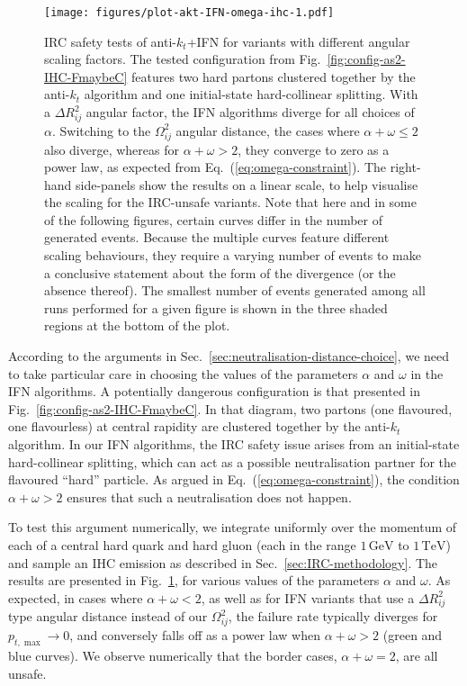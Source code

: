 \documentclass[nofootinbib,twocolumn,preprintnumbers,superscriptaddress,aps]{revtex4-2}
\newcommand{\GeV}{\,\text{GeV}}
\newcommand{\TeV}{\,\text{TeV}}
\newcommand{\ptmax}{p_{t,\max}}
\begin{document}
\begin{figure}
  \centering
  \texttt{[image: figures/plot-akt-IFN-omega-ihc-1.pdf]}
  \caption{
  IRC safety tests of anti-$k_t$+IFN for variants with different angular scaling factors. 
  The tested configuration from Fig.~\ref{fig:config-as2-IHC-FmaybeC} features two hard partons clustered
  together by the anti-$k_t$ algorithm and one initial-state hard-collinear
  splitting.
  With a $\Delta R_{ij}^2$ angular factor, the IFN algorithms diverge for all choices of $\alpha$.
  Switching to the $\Omega_{ij}^2$ angular distance, the cases where $\alpha+\omega \leq 2$ also diverge,
  whereas for $\alpha+\omega > 2$, they converge to zero as
  a power law, as expected from Eq.~(\ref{eq:omega-constraint}).
  The right-hand side-panels show the results on a linear scale,
  to help visualise the scaling for the IRC-unsafe variants.
  Note that here and in some of the following figures, certain curves differ
  in the number of generated events.
  Because the multiple curves feature
  different scaling behaviours, they require a varying number of events
  to make a conclusive statement about the form of the divergence (or
  the absence thereof).
  The smallest number of events generated among all runs performed for a
  given figure is shown in the three shaded regions at the bottom of the plot.
  }
  \label{fig:IFN-omegas}
\end{figure}


According to the arguments in Sec.~\ref{sec:neutralisation-distance-choice}, we need to take particular
care in choosing the values of the parameters $\alpha$ and $\omega$ in the
IFN algorithms.
%
A potentially dangerous configuration is that presented in
Fig.~\ref{fig:config-as2-IHC-FmaybeC}.
%
In that diagram, two partons (one flavoured, one flavourless) at central
rapidity are clustered together by the anti-$k_t$ algorithm. In our IFN
algorithms, the IRC safety issue arises from an initial-state hard-collinear
splitting, which can act as a possible neutralisation partner for the
flavoured ``hard'' particle.
%
As argued in Eq.~(\ref{eq:omega-constraint}), the condition
$\alpha+\omega > 2$ ensures that such a neutralisation does not happen.


To test this argument numerically, we integrate uniformly
over the momentum of each of a central hard quark and hard gluon (each
in the range $1\GeV$ to $1\TeV$) and sample an IHC emission as
described in Sec.~\ref{sec:IRC-methodology}.
%
The results are presented in Fig.~\ref{fig:IFN-omegas}, for various
values of the parameters $\alpha$ and $\omega$.
%
As expected, in cases where $\alpha+\omega < 2$, as well as for IFN
variants that use a $\Delta R_{ij}^2$ type angular distance instead
of our $\Omega_{ij}^2$, the failure rate typically diverges
for $\ptmax \to 0$,
%
and conversely falls off as a power law when
$\alpha + \omega > 2$ (green and blue curves).
%
We observe numerically that the border cases, $\alpha + \omega = 2$,
are all unsafe.
\end{document}
